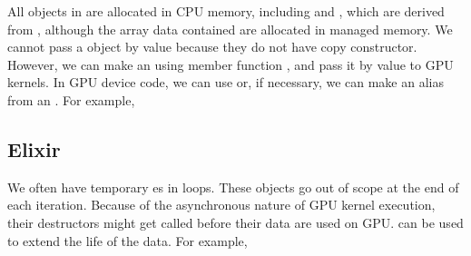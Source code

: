 \documentclass[letterpaper,10pt,english]{sphinxmanual}
\begin{document}
\sphinxAtStartPar
All  objects in  are allocated in
CPU memory, including  and , which are
derived from , although the array data contained are
allocated in managed memory.  We cannot pass a  object by
value because they do not have copy constructor.  However, we can make
an  using member function , and pass it
by value to GPU kernels. In GPU device code, we can use 
or, if necessary, we can make an alias  from an
.  For example,

\begin{sphinxVerbatim}[commandchars=\\\{\}]
       

        
   
\end{sphinxVerbatim}


\subsection{Elixir}
\label{\detokenize{GPU:elixir}}\label{\detokenize{GPU:sec-gpu-classes-elixir}}
\sphinxAtStartPar
We often have temporary es in  loops.
These objects go out of scope at the end of each iteration.  Because
of the asynchronous nature of GPU kernel execution, their destructors
might get called before their data are used on GPU.   can
be used to extend the life of the data.  For example,
\end{document}
